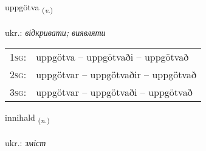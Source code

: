 \documentclass[frontgrid, backgrid]{flacards}\usepackage[]{graphicx}\usepackage[]{xcolor}
\begin{document}
\renewcommand{\flhead}{\vskip5pt \fboxsep=0pt {\small\bfseries\footnotesize Sagnorð | дієслово}}
\renewcommand{\fcfoot}{\vskip5pt \fboxsep=0pt \hspace{2pt}{\small\bfseries\footnotesize 3K}}

\renewcommand{\blhead}{\vskip5pt {\small\bfseries\footnotesize Sagnorð | дієслово }}
\renewcommand{\bcfoot}{\vskip5pt \hspace{2pt}{\small\bfseries\footnotesize 3K}}


{uppgötva \small{\textsubscript{(\textit{v.})}} \\[1ex] %
\textphonetic{[ʏhpkœtva]} \\
ukr.: \emph{відкривати; виявляти} \\  [2ex]
\renewcommand*{\arraystretch}{0.8}
\begin{tabular}{p{1cm}l}
\textsc{1sg}: & uppgötva -- uppgötvaði -- uppgötvað \\ 
\textsc{2sg}: & uppgötvar -- uppgötvaðir -- uppgötvað \\ 
\textsc{3sg}: & uppgötvar -- uppgötvaði -- uppgötvað \\ 
\end{tabular}
}

\renewcommand{\flhead}{\vskip5pt \fboxsep=0pt {\small\bfseries\footnotesize Nafnorð | іменник}}
\renewcommand{\fcfoot}{\vskip5pt \fboxsep=0pt \hspace{2pt}{\small\bfseries\footnotesize 3K}}

\renewcommand{\blhead}{\vskip5pt {\small\bfseries\footnotesize Nafnorð | іменник }}
\renewcommand{\bcfoot}{\vskip5pt \hspace{2pt}{\small\bfseries\footnotesize 3K}}


{innihald \small{\textsubscript{(\textit{n.})}} \\[1ex] %
\textphonetic{[ɪnɪhalt]} \\
ukr.: \emph{зміст} \\  [2ex]
\renewcommand*{\arraystretch}{0.8}
}
\end{document}
